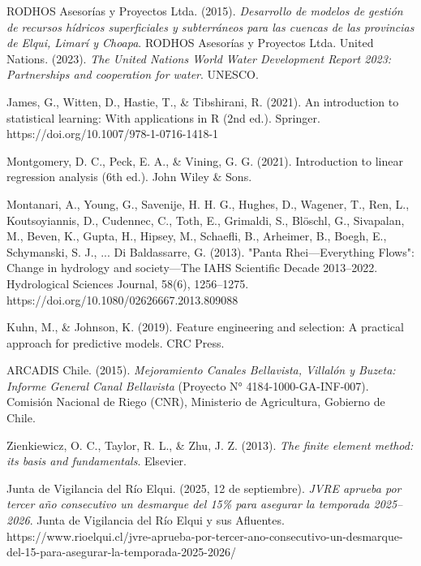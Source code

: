 \documentclass[12pt]{report}
\begin{document}
\begin{thebibliography}{}
\vspace{0.3cm} 
\bibitem{}\hypertarget{ref:rodhos2015}{RODHOS Asesorías y Proyectos Ltda. (2015). \textit{Desarrollo de modelos de gestión de recursos hídricos superficiales y subterráneos para las cuencas de las provincias de Elqui, Limarí y Choapa}. RODHOS Asesorías y Proyectos Ltda.}
\vspace{0.3cm} 
\bibitem{}\hypertarget{ref:un2023}{United Nations. (2023). \textit{The United Nations World Water Development Report 2023: Partnerships and cooperation for water}. UNESCO.}

\vspace{0.3cm} 
\bibitem{}\hypertarget{ref:james2021}{James, G., Witten, D., Hastie, T., \& Tibshirani, R. (2021). An introduction to statistical learning: With applications in R (2nd ed.). Springer. https://doi.org/10.1007/978-1-0716-1418-1}

\vspace{0.3cm} 
\bibitem{}\hypertarget{ref:montgomery2021}{Montgomery, D. C., Peck, E. A., \& Vining, G. G. (2021). Introduction to linear regression analysis (6th ed.). John Wiley \& Sons.}

\vspace{0.3cm} 
\bibitem{}\hypertarget{ref:montanari2013}{Montanari, A., Young, G., Savenije, H. H. G., Hughes, D., Wagener, T., Ren, L., Koutsoyiannis, D., Cudennec, C., Toth, E., Grimaldi, S., Blöschl, G., Sivapalan, M., Beven, K., Gupta, H., Hipsey, M., Schaefli, B., Arheimer, B., Boegh, E., Schymanski, S. J., ... Di Baldassarre, G. (2013). "Panta Rhei—Everything Flows": Change in hydrology and society—The IAHS Scientific Decade 2013–2022. Hydrological Sciences Journal, 58(6), 1256–1275. https://doi.org/10.1080/02626667.2013.809088}

\vspace{0.3cm} 
\bibitem{}\hypertarget{ref:kuhn2019b}{Kuhn, M., \& Johnson, K. (2019). Feature engineering and selection: A practical approach for predictive models. CRC Press.}

\vspace{0.3cm} 
\bibitem{}\hypertarget{ref:arcadis2015b}{ARCADIS Chile. (2015). \textit{Mejoramiento Canales Bellavista, Villalón y Buzeta: Informe General Canal Bellavista} (Proyecto N° 4184-1000-GA-INF-007). Comisión Nacional de Riego (CNR), Ministerio de Agricultura, Gobierno de Chile.}

\vspace{0.3cm}
\bibitem{}\hypertarget{ref:zienkiewicz2013}{Zienkiewicz, O. C., Taylor, R. L., \& Zhu, J. Z. (2013). \textit{The finite element method: its basis and fundamentals}. Elsevier.}

\vspace{0.3cm}
\bibitem{}\hypertarget{ref:jvre2025}{Junta de Vigilancia del Río Elqui. (2025, 12 de septiembre). \textit{JVRE aprueba por tercer año consecutivo un desmarque del 15\% para asegurar la temporada 2025–2026}. Junta de Vigilancia del Río Elqui y sus Afluentes. https://www.rioelqui.cl/jvre-aprueba-por-tercer-ano-consecutivo-un-desmarque-del-15-para-asegurar-la-temporada-2025-2026/}

\end{thebibliography}
\end{document}
